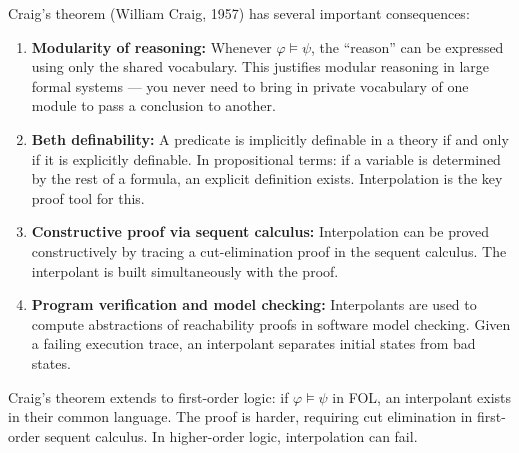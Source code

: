 \begin{remark}\label{rem:significance}
Craig's theorem (William Craig, 1957) has several important consequences:
\begin{enumerate}
  \item \textbf{Modularity of reasoning:} Whenever $\varphi \models \psi$, the
        ``reason'' can be expressed using only the shared vocabulary. This
        justifies modular reasoning in large formal systems — you never need to
        bring in private vocabulary of one module to pass a conclusion to another.
  \item \textbf{Beth definability:} A predicate is implicitly definable in a
        theory if and only if it is explicitly definable. In propositional terms:
        if a variable is determined by the rest of a formula, an explicit
        definition exists. Interpolation is the key proof tool for this.
  \item \textbf{Constructive proof via sequent calculus:} Interpolation can be
        proved constructively by tracing a cut-elimination proof in the sequent
        calculus. The interpolant is built simultaneously with the proof.
  \item \textbf{Program verification and model checking:} Interpolants are used
        to compute abstractions of reachability proofs in software model checking.
        Given a failing execution trace, an interpolant separates initial states
        from bad states.
\end{enumerate}
\end{remark}

\begin{remark}
Craig's theorem extends to first-order logic: if $\varphi \models \psi$ in FOL,
an interpolant exists in their common language. The proof is harder, requiring
cut elimination in first-order sequent calculus. In higher-order logic,
interpolation can fail.
\end{remark}
